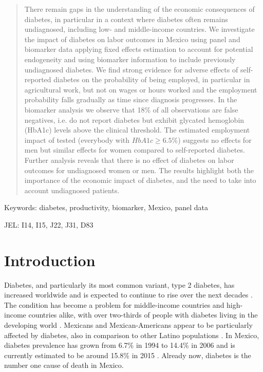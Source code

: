 \documentclass[12pt,english]{article}
\begin{document}
	
\begin{abstract}
There remain gaps in the understanding of the economic consequences of diabetes, in particular in a context where diabetes often remains undiagnosed, including low- and middle-income countries. We investigate the impact of diabetes on labor outcomes in Mexico using panel and biomarker data applying fixed effects estimation to account for potential endogeneity and using biomarker information to include previously undiagnosed diabetes. We find strong evidence for adverse effects of self-reported diabetes on the probability of being employed, in particular in agricultural work, but not on wages or hours worked and the employment probability falls gradually as time since diagnosis progresses. In the biomarker analysis we observe that 18\% of all observations are false negatives, i.e. do not report diabetes but exhibit glycated hemoglobin (HbA1c) levels above the clinical threshold. The estimated employment impact of tested (everybody with $HbA1c \geq 6.5\%$) suggests no effects for men but similar effects for women compared to self-reported diabetes. Further analysis reveals that there is no effect of diabetes on labor outcomes for undiagnosed women or men. The results highlight both the importance of the economic impact of diabetes, and the need to take into account undiagnosed patients.
\end{abstract}

Keywords: diabetes, productivity, biomarker, Mexico, panel data

JEL: I14, I15, J22, J31, D83


\section{\label{sec:Introduction4}Introduction }

Diabetes, and particularly its most common variant, type 2 diabetes, has increased worldwide and is expected to continue to rise over the next decades \parencite{Risk2016}. The condition has become a problem for middle-income countries and high-income countries alike, with over two-thirds of people with diabetes living in the developing world \parencite{InternationalDiabetesFederation2015}. Mexicans and Mexican-Americans appear to be particularly affected by diabetes, also in comparison to other Latino populations \parencite{Schneiderman2014}. In Mexico, diabetes prevalence has grown from 6.7\% in 1994 to 14.4\% in 2006 \parencite{Barquera2013} and is currently estimated to be around 15.8\% in 2015 \parencite{InternationalDiabetesFederation2015}. Already now, diabetes is the number one cause of death in Mexico. 
\end{document}
